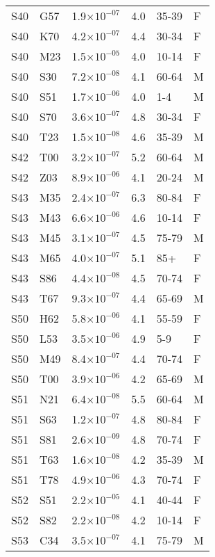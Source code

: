 \begin{longtable}{lllrll}
   S40 & G57 & 1.9$\times10^{-07}$ & 4.0 & 35-39 & F \\ 
   S40 & K70 & 4.2$\times10^{-07}$ & 4.4 & 30-34 & F \\ 
   S40 & M23 & 1.5$\times10^{-05}$ & 4.0 & 10-14 & F \\ 
   S40 & S30 & 7.2$\times10^{-08}$ & 4.1 & 60-64 & M \\ 
   S40 & S51 & 1.7$\times10^{-06}$ & 4.0 & 1-4 & M \\ 
   S40 & S70 & 3.6$\times10^{-07}$ & 4.8 & 30-34 & F \\ 
   S40 & T23 & 1.5$\times10^{-08}$ & 4.6 & 35-39 & M \\ 
   S42 & T00 & 3.2$\times10^{-07}$ & 5.2 & 60-64 & M \\ 
   S42 & Z03 & 8.9$\times10^{-06}$ & 4.1 & 20-24 & M \\ 
   S43 & M35 & 2.4$\times10^{-07}$ & 6.3 & 80-84 & F \\ 
   S43 & M43 & 6.6$\times10^{-06}$ & 4.6 & 10-14 & F \\ 
   S43 & M45 & 3.1$\times10^{-07}$ & 4.5 & 75-79 & M \\ 
   S43 & M65 & 4.0$\times10^{-07}$ & 5.1 & 85+ & F \\ 
   S43 & S86 & 4.4$\times10^{-08}$ & 4.5 & 70-74 & F \\ 
   S43 & T67 & 9.3$\times10^{-07}$ & 4.4 & 65-69 & M \\ 
   S50 & H62 & 5.8$\times10^{-06}$ & 4.1 & 55-59 & F \\ 
   S50 & L53 & 3.5$\times10^{-06}$ & 4.9 & 5-9 & F \\ 
   S50 & M49 & 8.4$\times10^{-07}$ & 4.4 & 70-74 & F \\ 
   S50 & T00 & 3.9$\times10^{-06}$ & 4.2 & 65-69 & M \\ 
   S51 & N21 & 6.4$\times10^{-08}$ & 5.5 & 60-64 & M \\ 
   S51 & S63 & 1.2$\times10^{-07}$ & 4.8 & 80-84 & F \\ 
   S51 & S81 & 2.6$\times10^{-09}$ & 4.8 & 70-74 & F \\ 
   S51 & T63 & 1.6$\times10^{-08}$ & 4.2 & 35-39 & M \\ 
   S51 & T78 & 4.9$\times10^{-06}$ & 4.3 & 70-74 & F \\ 
   S52 & S51 & 2.2$\times10^{-05}$ & 4.1 & 40-44 & F \\ 
   S52 & S82 & 2.2$\times10^{-08}$ & 4.2 & 10-14 & F \\ 
   S53 & C34 & 3.5$\times10^{-07}$ & 4.1 & 75-79 & M \\ 

\end{longtable}
